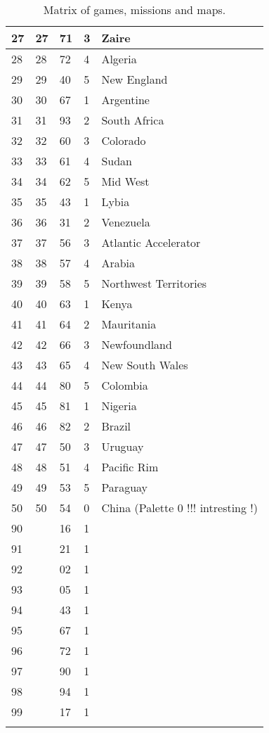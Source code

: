 \documentclass[a4paper,twoside,12pt,dvips]{article}
\begin{document}
\begin{center}
\begin{longtable}{|l|l|l|l|l|}
\hline
27 & 27 & 71 & 3 & Zaire \\
\hline
28 & 28 & 72 & 4 & Algeria \\
\hline
29 & 29 & 40 & 5 & New England \\
\hline
30 & 30 & 67 & 1 & Argentine \\
\hline
31 & 31 & 93 & 2 & South Africa \\
\hline
32 & 32 & 60 & 3 & Colorado \\
\hline
33 & 33 & 61 & 4 & Sudan \\
\hline
34 & 34 & 62 & 5 & Mid West \\
\hline
35 & 35 & 43 & 1 & Lybia \\
\hline
36 & 36 & 31 & 2 & Venezuela \\
\hline
37 & 37 & 56 & 3 & Atlantic Accelerator \\
\hline
38 & 38 & 57 & 4 & Arabia \\
\hline
39 & 39 & 58 & 5 & Northwest Territories \\
\hline
40 & 40 & 63 & 1 & Kenya \\
\hline
41 & 41 & 64 & 2 & Mauritania \\
\hline
42 & 42 & 66 & 3 & Newfoundland \\
\hline
43 & 43 & 65 & 4 & New South Wales \\
\hline
44 & 44 & 80 & 5 & Colombia \\
\hline
45 & 45 & 81 & 1 & Nigeria \\
\hline
46 & 46 & 82 & 2 & Brazil \\
\hline
47 & 47 & 50 & 3 & Uruguay \\
\hline
48 & 48 & 51 & 4 & Pacific Rim \\
\hline
49 & 49 & 53 & 5 & Paraguay \\
\hline
50 & 50 & 54 & 0 & China (Palette 0 !!! intresting !) \\
\hline
90 &  ~ & 16 & 1 & ~ \\
\hline
91 &  ~ & 21 & 1 & ~ \\
\hline
92 &  ~ & 02 & 1 & ~ \\
\hline
93 &  ~ & 05 & 1 & ~ \\
\hline
94 &  ~ & 43 & 1 & ~ \\
\hline
95 &  ~ & 67 & 1 & ~ \\
\hline
96 &  ~ & 72 & 1 & ~ \\
\hline
97 &  ~ & 90 & 1 & ~ \\
\hline
98 &  ~ & 94 & 1 & ~ \\
\hline
99 &  ~ & 17 & 1 & ~ \\
\hline

    \caption[Matrix of games, missions and maps.]{Matrix of games, missions and maps.} \label{tab:matrixmismapgame} \\

  \end{longtable}
\end{center}
\end{document}
